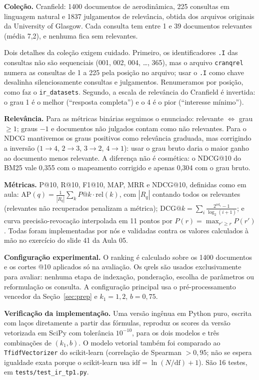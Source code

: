\documentclass[10pt,twocolumn,a4paper]{article}
\begin{document}
\textbf{Coleção.} Cranfield: 1400 documentos de aerodinâmica, 225 consultas em
linguagem natural e 1837 julgamentos de relevância, obtida dos arquivos
originais da University of Glasgow. Cada consulta tem entre 1 e 39 documentos
relevantes (média 7,2), e nenhuma fica sem relevantes.

Dois detalhes da coleção exigem cuidado. Primeiro, os identificadores
\texttt{.I} das consultas não são sequenciais (001, 002, 004, \dots, 365), mas o
arquivo \texttt{cranqrel} numera as consultas de 1 a 225 pela posição no
arquivo; usar o \texttt{.I} como chave desalinha silenciosamente consultas e
julgamentos. Renumeramos por posição, como faz o \texttt{ir\_datasets}. Segundo,
a escala de relevância do Cranfield é invertida: o grau 1 é o melhor (``resposta
completa'') e o 4 é o pior (``interesse mínimo'').

\textbf{Relevância.} Para as métricas binárias seguimos o enunciado: relevante
$\Leftrightarrow$ grau $\geq 1$; graus $-1$ e documentos não julgados contam como
não relevantes. Para o NDCG mantivemos os graus positivos como relevância
graduada, mas corrigindo a inversão ($1\!\to\!4$, $2\!\to\!3$, $3\!\to\!2$,
$4\!\to\!1$): usar o grau bruto daria o maior ganho ao documento menos
relevante. A diferença não é cosmética: o NDCG@10 do BM25 vale 0,355 com o
mapeamento corrigido e apenas 0,304 com o grau bruto.

\textbf{Métricas.} P@10, R@10, F1@10, MAP, MRR e NDCG@10, definidas como em
aula: $\mathrm{AP}(q) = \frac{1}{|R_q|}\sum_k P@k \cdot \mathrm{rel}(k)$, com
$|R_q|$ contando todos os relevantes (relevantes não recuperados penalizam a
métrica); $\mathrm{DCG}@k = \sum_i \frac{2^{\mathrm{rel}_i}-1}{\log_2(i+1)}$; e
curva precisão-revocação interpolada em 11 pontos por
$P(r) = \max_{r' \geq r} P(r')$. Todas foram implementadas por nós e validadas
contra os valores calculados à mão no exercício do slide 41 da Aula 05.

\textbf{Configuração experimental.} O ranking é calculado sobre os 1400
documentos e os cortes @10 aplicados só na avaliação. Os qrels são usados
exclusivamente para avaliar: nenhuma etapa de indexação, ponderação, escolha de
parâmetros ou reformulação os consulta. A configuração principal usa o
pré-processamento vencedor da Seção~\ref{sec:prep} e $k_1 = 1{,}2$,
$b = 0{,}75$.

\textbf{Verificação da implementação.} Uma versão ingênua em Python puro,
escrita com laços diretamente a partir das fórmulas, reproduz os scores da
versão vetorizada em SciPy com tolerância $10^{-10}$, para os dois modelos e
três combinações de $(k_1, b)$. O modelo vetorial também foi comparado ao
\texttt{TfidfVectorizer} do scikit-learn (correlação de Spearman $> 0{,}95$; não
se espera igualdade exata porque o scikit-learn usa
$\mathrm{idf} = \ln(N/\mathrm{df}) + 1$). São 16 testes, em
\texttt{tests/test\_ir\_tp1.py}.
\end{document}
